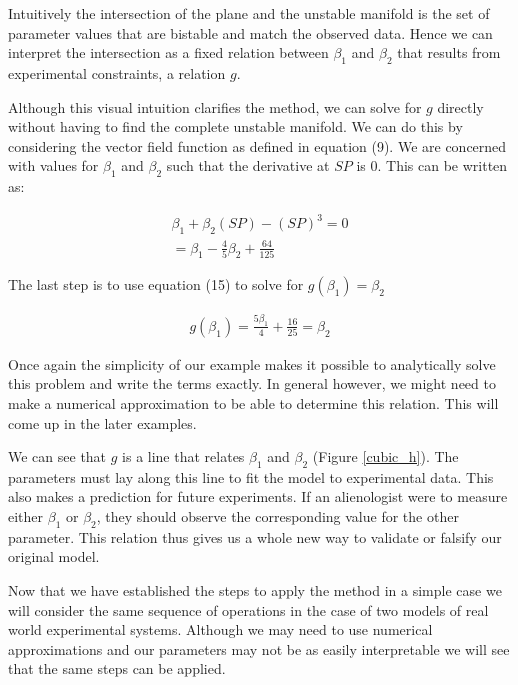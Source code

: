 \documentclass[letterpaper]{article}
\begin{document}
Intuitively the intersection of the plane and the unstable manifold is the set
of parameter values that are bistable and match the observed data. Hence we 
can interpret the intersection as a fixed relation between $\beta_1$ and $\beta_2$
that results from experimental constraints, a relation $g$. 

Although this visual intuition clarifies the method, we can solve for $g$ directly
without having to find the complete unstable manifold. We can do this by considering
the vector field function as defined in equation (9). We are concerned with values
for $\beta_1$ and $\beta_2$ such that the derivative at $SP$ 
is $0$. This can be written as:

\begin{equation}
  \begin{aligned}
  \beta_1 + \beta_2 (SP) - (SP)^3 = 0\\
  = \beta_1 - \frac{4}{5} \beta_2 + \frac{64}{125}
  \end{aligned}
\end{equation}

The last step is to use equation (15) to solve for $g(\beta_1) = \beta_2$

\begin{eqnarray}
  g(\beta_1) = \frac{5\beta_1}{4} + \frac{16}{25} = \beta_2
\end{eqnarray}

Once again the simplicity of our example makes it possible to analytically 
solve this problem and write the terms exactly.
In general however, we might need to make a numerical
approximation to be able to determine this relation. This will come up in the 
later examples.

We can see that $g$ is a line that relates $\beta_1$ and $\beta_2$
(Figure \ref{cubic_h}). The parameters
must lay along this line to fit the model to experimental data. This also makes 
a prediction for future experiments. If an alienologist were to measure either
$\beta_1$ or $\beta_2$, they should observe the corresponding value for the
other parameter. This relation thus gives us a whole new way to validate or
falsify our original model. 

Now that we have established the steps to apply the method in a simple case we will
consider the same sequence of operations in the case of two models of real world
experimental
systems. Although we may need to use numerical approximations and 
our parameters may not
be as easily interpretable we will see that the same steps can be applied.
\end{document}
